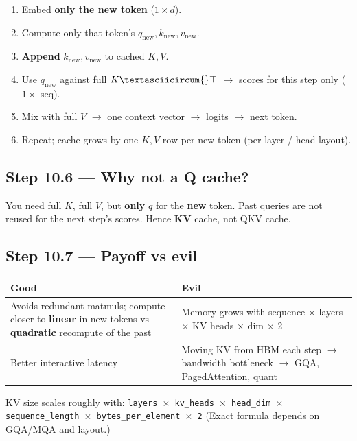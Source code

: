 \documentclass[11pt,a4paper]{article}
\begin{document}
\begin{enumerate}
\item Embed \textbf{only the new token} (\(1 \times d\)).  
\item Compute only that token's \(q_{\text{new}}, k_{\text{new}}, v_{\text{new}}\).  
\item \textbf{Append} \(k_{\text{new}}, v_{\text{new}}\) to cached \(K,V\).  
\item Use \(q_{\text{new}}\) against full \(K\textasciicircum{}\top\) $\rightarrow$ scores for this step only (\(1 \times\) seq).  
\item Mix with full \(V\) $\rightarrow$ one context vector $\rightarrow$ logits $\rightarrow$ next token.  
\item Repeat; cache grows by one \(K,V\) row per new token (per layer / head layout).
\end{enumerate}


\subsection{Step 10.6 --- Why not a Q cache?}

You need full \(K\), full \(V\), but \textbf{only} \(q\) for the \textbf{new} token. Past queries are not reused for the next step's scores. Hence \textbf{KV} cache, not QKV cache.


\subsection{Step 10.7 --- Payoff vs evil}


\begin{table}[ht]
\centering\small
\begin{tabularx}{\textwidth}{@{}YY@{}}
\toprule
\textbf{Good} & \textbf{Evil} \\
\midrule
Avoids redundant matmuls; compute closer to \textbf{linear} in new tokens vs \textbf{quadratic} recompute of the past & Memory grows with sequence $\times$ layers $\times$ KV heads $\times$ dim $\times$ 2 \\
Better interactive latency & Moving KV from HBM each step $\rightarrow$ bandwidth bottleneck $\rightarrow$ GQA, PagedAttention, quant \\
\bottomrule
\end{tabularx}
\end{table}


KV size scales roughly with:
\texttt{layers $\times$ kv\_heads $\times$ head\_dim $\times$ sequence\_length $\times$ bytes\_per\_element $\times$ 2}
(Exact formula depends on GQA/MQA and layout.)
\end{document}
